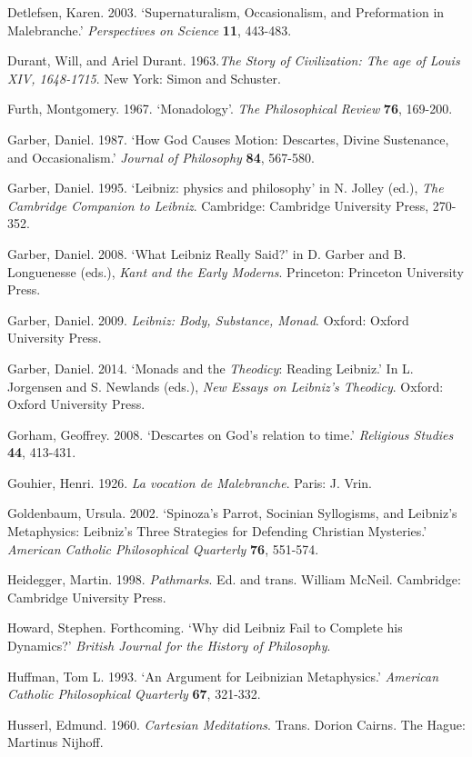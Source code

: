 \documentclass{article}
\begin{document}
Detlefsen, Karen. 2003. `Supernaturalism, Occasionalism, and
Preformation in Malebranche.' \emph{Perspectives on Science}
\textbf{11}, 443-483.

Durant, Will, and Ariel Durant. 1963.\emph{The Story of Civilization:
The age of Louis XIV, 1648-1715}. New York: Simon and Schuster.

Furth, Montgomery. 1967. `Monadology'. \emph{The Philosophical Review}
\textbf{76}, 169-200.

Garber, Daniel. 1987. `How God Causes Motion: Descartes, Divine
Sustenance, and Occasionalism.' \emph{Journal of Philosophy}
\textbf{84}, 567-580.

Garber, Daniel. 1995. `Leibniz: physics and philosophy' in N. Jolley
(ed.), \emph{The Cambridge Companion to Leibniz}. Cambridge: Cambridge
University Press, 270-352.

Garber, Daniel. 2008. `What Leibniz Really Said?' in D. Garber and B.
Longuenesse (eds.), \emph{Kant and the Early Moderns}. Princeton:
Princeton University Press.

Garber, Daniel. 2009. \emph{Leibniz: Body, Substance, Monad}. Oxford:
Oxford University Press.

Garber, Daniel. 2014. `Monads and the \emph{Theodicy}: Reading Leibniz.'
In L. Jorgensen and S. Newlands (eds.), \emph{New Essays on Leibniz's
Theodicy}. Oxford: Oxford University Press.

Gorham, Geoffrey. 2008. `Descartes on God's relation to time.'
\emph{Religious Studies} \textbf{44}, 413-431.

Gouhier, Henri. 1926. \emph{La vocation de Malebranche}. Paris: J. Vrin.

Goldenbaum, Ursula. 2002. `Spinoza's Parrot, Socinian Syllogisms, and
Leibniz's Metaphysics: Leibniz's Three Strategies for Defending
Christian Mysteries.' \emph{American Catholic Philosophical Quarterly}
\textbf{76}, 551-574.

Heidegger, Martin. 1998. \emph{Pathmarks}. Ed. and trans. William
McNeil. Cambridge: Cambridge University Press.

Howard, Stephen. Forthcoming. `Why did Leibniz Fail to Complete his
Dynamics?' \emph{British Journal for the History of Philosophy}.

Huffman, Tom L. 1993. `An Argument for Leibnizian Metaphysics.'
\emph{American Catholic Philosophical Quarterly} \textbf{67}, 321-332.

Husserl, Edmund. 1960. \emph{Cartesian Meditations}. Trans. Dorion
Cairns. The Hague: Martinus Nijhoff.
\end{document}
